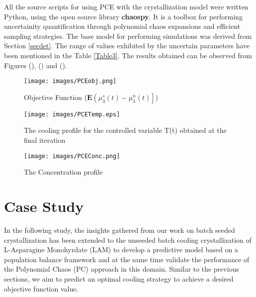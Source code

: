 \documentclass[3p,times,authoryear]{elsarticle}
\begin{document}
All the source scripts for using PCE with the crystallization model were written Python, using the open source library \textbf{chaospy}\cite{chaospy}. It is a toolbox for performing uncertainity quantification through polynomial chaos expansions and efficient sampling strategies. The base model for performing simulations was derived from Section \ref{secdet}. The range of values exhibited by the uncertain parameters have been mentioned in the Table \ref{Table3}. The results obtained can be observed from Figures (\label{PCEObj}), (\label{PCETemp}) and (\label{PCEConc}).



\begin{figure}[h!] 
\begin{center}
\texttt{[image: images/PCEobj.png]} 
\end{center}
\caption{Objective Function ($\mathbf{E}\left(\mu_{3}^{s}(t) - \mu_{3}^{n}(t)\right]$)} \label{PCEObj}
\end{figure}


\begin{figure}[h!] 
\begin{center} 
\texttt{[image: images/PCETemp.eps]} 
\end{center}
\caption{The cooling profile for the controlled variable T(t) obtained at the final iteration} 
\end{figure}

\begin{figure}[h!] 

\begin{center}
\texttt{[image: images/PCEConc.png]} 
\end{center}
\caption{The Concentration profile} \label{PCEConc}
\end{figure}

\section{Case Study}

In the following study, the insights gathered from our work on batch seeded crystallization has been extended to the unseeded batch cooling crystallization of L-Asparagine Monohyrdate (LAM) to develop a predictive model based on a population balance framework and at the same time validate the performance of the Polynomial Chaos (PC) approach in this domain. Similar to the previous sections, we aim to predict an optimal cooling strategy to achieve a desired objective function value.
\end{document}
